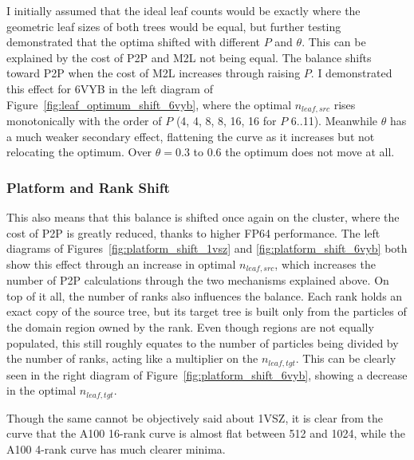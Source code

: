 


I initially assumed that the ideal leaf counts would be exactly where the geometric leaf sizes of both trees would be equal, but further testing demonstrated that the optima shifted with different $P$ and $\theta$.
This can be explained by the cost of P2P and M2L not being equal.
The balance shifts toward P2P when the cost of M2L increases through raising $P$.
I demonstrated this effect for 6VYB in the left diagram of Figure~\ref{fig:leaf_optimum_shift_6vyb}, where the optimal $n_{leaf,src}$ rises monotonically with the order of $P$ (4, 4, 8, 8, 16, 16 for $P$ 6..11).
Meanwhile $\theta$ has a much weaker secondary effect, flattening the curve as it increases but not relocating the optimum.
Over $\theta = 0.3$ to $0.6$ the optimum does not move at all.




\subsubsection{Platform and Rank Shift}

This also means that this balance is shifted once again on the cluster, where the cost of P2P is greatly reduced, thanks to higher FP64 performance.
The left diagrams of Figures~\ref{fig:platform_shift_1vsz} and \ref{fig:platform_shift_6vyb} both show this effect through an increase in optimal $n_{leaf,src}$, which increases the number of P2P calculations through the two mechanisms explained above.
On top of it all, the number of ranks also influences the balance.
Each rank holds an exact copy of the source tree, but its target tree is built only from the particles of the domain region owned by the rank.
Even though regions are not equally populated, this still roughly equates to the number of particles being divided by the number of ranks, acting like a multiplier on the $n_{leaf,tgt}$.
This can be clearly seen in the right diagram of Figure~\ref{fig:platform_shift_6vyb}, showing a decrease in the optimal $n_{leaf,tgt}$.




Though the same cannot be objectively said about 1VSZ, it is clear from the curve that the A100 16-rank curve is almost flat between 512 and 1024, while the A100 4-rank curve has much clearer minima.

